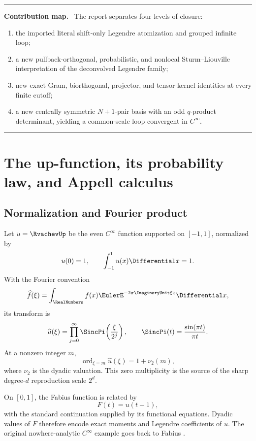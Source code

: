 \documentclass[11pt,oneside]{article}
\numberwithin{equation}{section}
\theoremstyle{definition}
\theoremstyle{remark}
\newenvironment{resultbox}[1]
{\begin{center}\begin{minipage}{0.94\textwidth}\hrule\vspace{0.45em}
\noindent\textbf{#1.}\ }{\vspace{0.45em}\hrule\end{minipage}\end{center}}
\newcommand{\ord}{\operatorname{ord}}
\begin{document}
\begin{resultbox}{Contribution map}
The report separates four levels of closure:
\begin{enumerate}[leftmargin=1.8em,itemsep=0.2em]
\item the imported literal shift-only Legendre atomization and grouped infinite
loop;
\item a new pullback-orthogonal, probabilistic, and nonlocal
Sturm--Liouville interpretation of the deconvolved Legendre family;
\item new exact Gram, biorthogonal, projector, and tensor-kernel identities at
every finite cutoff;
\item a new centrally symmetric $N+1$-pair basis with an odd $q$-product
determinant, yielding a common-scale loop convergent in $C^\infty$.
\end{enumerate}
\end{resultbox}

\section{The up-function, its probability law, and Appell calculus}
\label{sec:background}

\subsection{Normalization and Fourier product}

Let $u=\RvachevUp$ be the even $C^\infty$ function supported on $[-1,1]$, normalized
by
\[
 u(0)=1,\qquad \int_{-1}^{1}u(x)\Differential x=1.
\]
With the Fourier convention
\[
 \widehat f(\xi)=\int_{\RealNumbers}f(x)\EulerE^{-2\pi\ImaginaryUnit\xi x}\Differential x,
\]
its transform is
\begin{equation}
 \widehat u(\xi)=\prod_{j=0}^{\infty}
 \SincPi\!\left(\frac{\xi}{2^j}\right),
 \qquad \SincPi(t)=\frac{\sin(\pi t)}{\pi t}.
 \label{eq:fourier-product}
\end{equation}
At a nonzero integer $m$,
\begin{equation}
 \ord_{\xi=m}\widehat u(\xi)=1+\nu_2(m),
 \label{eq:zero-order}
\end{equation}
where $\nu_2$ is the dyadic valuation.  This zero multiplicity is the source
of the sharp degree-$d$ reproduction scale $2^d$.

On $[0,1]$, the Fabius function is related by
\begin{equation}
 F(t)=u(t-1),
 \label{eq:F-up}
\end{equation}
with the standard continuation supplied by its functional equations.  Dyadic
values of $F$ therefore encode exact moments and Legendre coefficients of $u$.
The original nowhere-analytic $C^\infty$ example goes back to Fabius
\cite{Fabius1966}.
\end{document}
